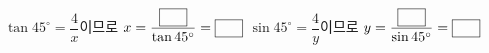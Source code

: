\noindent\begin{minipage}[t]{0.58\linewidth}\vspace{0pt}\raggedright \end{minipage}\hfill\begin{minipage}[t]{0.4\linewidth}\vspace{0pt}\centering \resizebox{\ifdim\width>\linewidth\linewidth\else\width\fi}{!}{}\end{minipage}\par
{} $\tan 45^\circ=\dfrac{4}{x}$이므로 $x=\dfrac{\blank[2em]}{\tan 45^\circ}=\blank[2em]$
 $\sin 45^\circ=\dfrac{4}{y}$이므로 $y=\dfrac{\blank[2em]}{\sin 45^\circ}=\blank[2em]$
